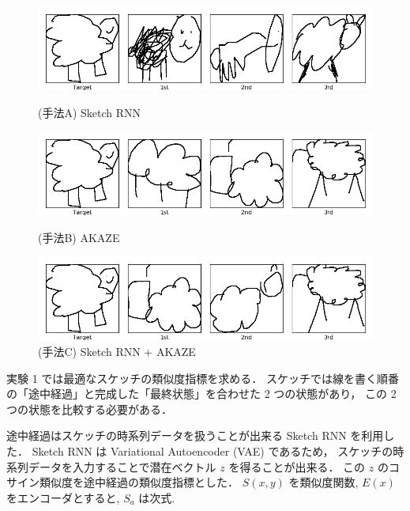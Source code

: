 \documentclass[twocolumn]{jarticle}     %
\begin{document}
\begin{figure}[tb]
 \begin{minipage}{1\hsize}
 	\begin{center}
 		\includegraphics[clip,width=120mm]{sketch_trained_sim_A_0.png}
 		\caption{(手法A) Sketch RNN}
 		\label{fig:exp1_a}
 	\end{center}
 \end{minipage}

  \begin{minipage}{1\hsize}
  	\begin{center}
  		\includegraphics[clip,width=120mm]{sketch_trained_sim_B_0.png}
  		\caption{(手法B) AKAZE}
  		\label{fig:exp1_b}
  	\end{center}
  \end{minipage}

   \begin{minipage}{1\hsize}
   	\begin{center}
   		\includegraphics[clip,width=120mm]{sketch_trained_sim_D_0.png}
   		\caption{(手法C) Sketch RNN + AKAZE}
   		\label{fig:exp1_c}
   	\end{center}
   \end{minipage}
\end{figure}

実験 1 では最適なスケッチの類似度指標を求める．
スケッチでは線を書く順番の「途中経過」と完成した「最終状態」を合わせた 2 つの状態があり，
この 2 つの状態を比較する必要がある．

途中経過はスケッチの時系列データを扱うことが出来る Sketch RNN を利用した．
Sketch RNN は Variational Autoencoder (VAE) であるため，
スケッチの時系列データを入力することで潜在ベクトル $z$ を得ることが出来る．
この $z$ のコサイン類似度を途中経過の類似度指標とした．
$S(x, y)$ を類似度関数, $E(x)$ をエンコーダとすると, $S_a$ は次式.
\end{document}

